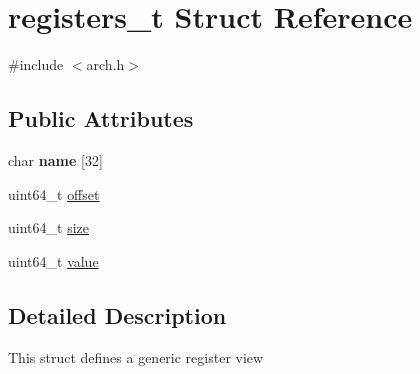 \hypertarget{structregisters__t}{\section{registers\-\_\-t Struct Reference}
\label{structregisters__t}
}


{\ttfamily \#include $<$arch.\-h$>$}

\subsection*{Public Attributes}
\begin{DoxyCompactItemize}
\item 
\hypertarget{structregisters__t_a2c8742f0d2dc78bd44b8b8d421f347d3}{char {\bfseries name} \mbox{[}32\mbox{]}}\label{structregisters__t_a2c8742f0d2dc78bd44b8b8d421f347d3}

\item 
uint64\-\_\-t \hyperlink{structregisters__t_a191e9e10bdb03f486392e89c6779f6b2}{offset}
\item 
uint64\-\_\-t \hyperlink{structregisters__t_acb764ed24b115568e56a1144d5eb0a1d}{size}
\item 
uint64\-\_\-t \hyperlink{structregisters__t_a2fd077f839ddcab48b721f9fce79cf91}{value}
\end{DoxyCompactItemize}


\subsection{Detailed Description}
This struct defines a generic register view 

